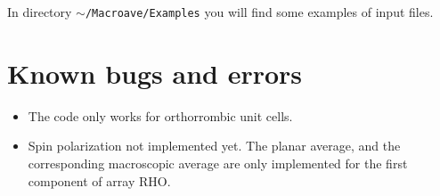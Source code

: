  In directory {\tt $\sim$/Macroave/Examples} you will find some
 examples of input files.

 \section{Known bugs and errors}

 \begin{itemize}
    \item The code only works for orthorrombic unit cells. 
    \item Spin polarization not implemented yet. 
          The planar average, and the corresponding macroscopic average
          are only implemented for the first component of array RHO.
 \end{itemize}


